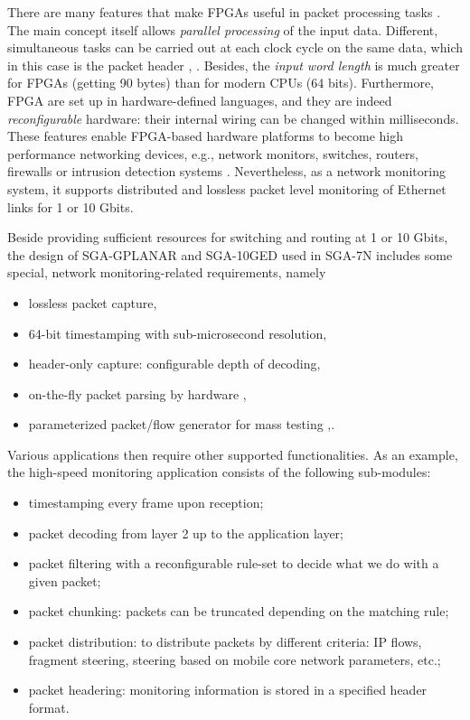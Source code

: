 \documentclass[journal]{IEEEtran}
\begin{document}
There are many features that make FPGAs useful in packet processing tasks \cite{NetFPGA}. The main concept itself allows \emph{parallel processing} of the input data. Different, simultaneous tasks can be carried out at each clock cycle on the same data, which in this case is the packet header \cite{XILINX_PacketProc}, \cite{Weirong_Scalable_PacketProc_FPGA}. Besides, the \emph{input word length} is much greater for FPGAs (getting 90 bytes) than for modern CPUs (64 bits). Furthermore, FPGA are set up in hardware-defined languages, and they are indeed \emph{reconfigurable} hardware: their internal wiring can be changed within milliseconds. These features enable FPGA-based hardware platforms to become high performance networking devices, e.g., network monitors, switches, routers, firewalls or intrusion detection systems \cite{IM_2015_FPGA}. Nevertheless, as a network monitoring system, it supports distributed and lossless packet level monitoring of Ethernet links for 1 or 10 Gbit\/s.

Beside providing sufficient resources for switching and routing at 1 or 10 Gbit\/s, the design of SGA-GPLANAR \cite{GPLANAR} and SGA-10GED \cite{10GED} used in SGA-7N includes some special, network monitoring-related requirements, namely 
\begin{itemize}
\renewcommand\labelitemi{--}
\item lossless packet capture,
\item 64-bit timestamping with sub-microsecond resolution,
\item header-only capture: configurable depth of decoding,
\item on-the-fly packet parsing by hardware \cite{Low_Latency_Header_Parser},
\item parameterized packet/flow generator for mass testing \cite{Olaszi_Complex_Load_Testing_of_Mobile_PS_and_CS_Core},\cite{Soos_Mesterproba}.
\end{itemize}

Various applications then require other supported functionalities. As an example, the high-speed monitoring application \cite{C-GEP_HPSR} consists of the following sub-modules:
\begin{itemize}
\renewcommand\labelitemi{--}
\item timestamping every frame upon reception;
\item packet decoding from layer 2  up to the application layer;
\item packet filtering with a reconfigurable rule-set to decide what we do with a given packet;
\item packet chunking: packets can be truncated depending on the matching rule;
\item packet distribution: to distribute packets by different criteria: IP flows, fragment steering, steering based on mobile core network parameters, etc.;
\item packet headering: monitoring information is stored in a specified header format.
\end{itemize}
\end{document}
